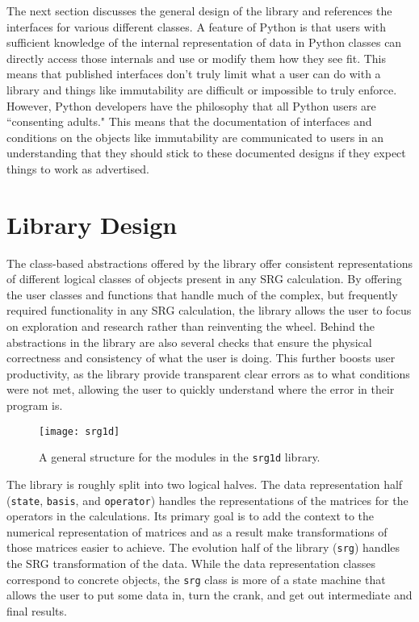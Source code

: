 The next section discusses the general design of the library and references the interfaces for various different classes. A feature of Python is that users with sufficient knowledge of the internal representation of data in Python classes can directly access those internals and use or modify them how they see fit. This means that published interfaces don't truly limit what a user can do with a library and things like immutability are difficult or impossible to truly enforce. However, Python developers have the philosophy that all Python users are ``consenting adults." This means that the documentation of interfaces and conditions on the objects like immutability are communicated to users in an understanding that they should stick to these documented designs if they expect things to work as advertised.

\section{Library Design}

The class-based abstractions offered by the library offer consistent representations of different logical classes of objects present in any SRG calculation. By offering the user classes and functions that handle much of the complex, but frequently required functionality in any SRG calculation, the library allows the user to focus on exploration and research rather than reinventing the wheel. Behind the abstractions in the library are also several checks that ensure the physical correctness and consistency of what the user is doing. This further boosts user productivity, as the library provide transparent clear errors as to what conditions were not met, allowing the user to quickly understand where the error in their program is.

\begin{figure}[t]
\begin{center}
\texttt{[image: srg1d]}
\end{center}
\caption{A general structure for the modules in the \texttt{srg1d} library.}
\label{fig:srg1d}
\end{figure}

The library is roughly split into two logical halves. The data representation half (\texttt{state}, \texttt{basis}, and \texttt{operator}) handles the representations of the matrices for the operators in the calculations. Its primary goal is to add the context to the numerical representation of matrices and as a result make transformations of those matrices easier to achieve. The evolution half of the library (\texttt{srg}) handles the SRG transformation of the data. While the data representation classes correspond to concrete objects, the \texttt{srg} class is more of a state machine that allows the user to put some data in, turn the crank, and get out intermediate and final results.

